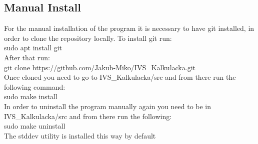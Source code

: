 \documentclass{article}
\begin{document}
	\subsection{Manual Install}
	For the manual installation of the program it is necessary to have git installed, in order to clone the repository locally. To install git run:\\
	sudo apt install git\\
	After that run:\\
	git clone https://github.com/Jakub-Miko/IVS\_Kalkulacka.git\\
	Once cloned you need to go to IVS\_Kalkulacka/src and from there run the following command:\\
	sudo make install\\
	In order to uninstall the program manually again you need to be in IVS\_Kalkulacka/src and from there run the following:\\
	sudo make uninstall\\
    The stddev utility is installed this way by default
	\newpage
	
\end{document}
